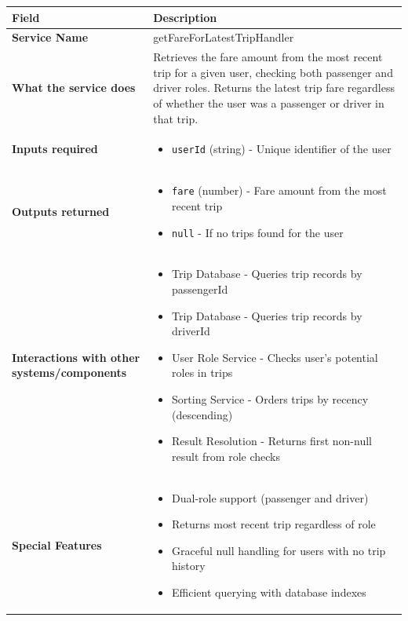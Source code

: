 \documentclass[11pt,a4paper]{article}
\begin{document}
\begin{longtable}{|p{4cm}|p{12cm}|}
\hline
\textbf{Field} & \textbf{Description} \\
\hline
\textbf{Service Name} & getFareForLatestTripHandler \\
\hline
\textbf{What the service does} & 
Retrieves the fare amount from the most recent trip for a given user, checking both passenger and driver roles. Returns the latest trip fare regardless of whether the user was a passenger or driver in that trip. \\
\hline
\textbf{Inputs required} & 
\begin{itemize}[nosep]
\item \texttt{userId} (string) - Unique identifier of the user
\end{itemize} \\
\hline
\textbf{Outputs returned} & 
\begin{itemize}[nosep]
\item \texttt{fare} (number) - Fare amount from the most recent trip
\item \texttt{null} - If no trips found for the user
\end{itemize} \\
\hline
\textbf{Interactions with other systems/components} & 
\begin{itemize}[nosep]
\item Trip Database - Queries trip records by passengerId
\item Trip Database - Queries trip records by driverId
\item User Role Service - Checks user's potential roles in trips
\item Sorting Service - Orders trips by recency (descending)
\item Result Resolution - Returns first non-null result from role checks
\end{itemize} \\
\hline
\textbf{Special Features} & 
\begin{itemize}[nosep]
\item Dual-role support (passenger and driver)
\item Returns most recent trip regardless of role
\item Graceful null handling for users with no trip history
\item Efficient querying with database indexes
\end{itemize} \\
\hline
\end{longtable}
\end{document}
